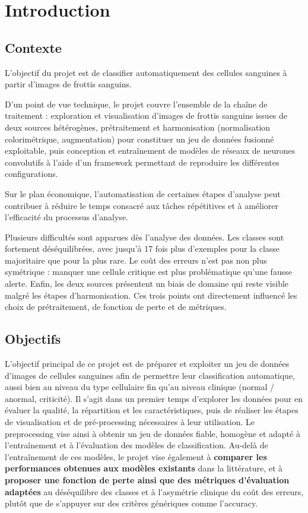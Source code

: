 \section{Introduction}
\subsection{Contexte}

L’objectif du projet est de classifier automatiquement des cellules sanguines à partir d’images de frottis sanguins.

D’un point de vue technique, le projet couvre l’ensemble de la chaîne de traitement : exploration et visualisation d’images de frottis sanguins issues de deux sources hétérogènes, prétraitement et harmonisation (normalisation colorimétrique, augmentation) pour constituer un jeu de données fusionné exploitable, puis conception et entraînement de modèles de réseaux de neurones convolutifs à l'aide d'un framework permettant de reproduire les différentes configurations.

Sur le plan économique, l’automatisation de certaines étapes d’analyse peut contribuer à réduire le temps consacré aux tâches répétitives et à améliorer l’efficacité du processus d’analyse.

Plusieurs difficultés sont apparues dès l’analyse des données. Les classes sont fortement déséquilibrées, avec jusqu’à 17 fois plus d’exemples pour la classe majoritaire que pour la plus rare. Le coût des erreurs n’est pas non plus symétrique : manquer une cellule critique est plus problématique qu’une fausse alerte. Enfin, les deux sources présentent un biais de domaine qui reste visible malgré les étapes d’harmonisation.
Ces trois points ont directement influencé les choix de prétraitement, de fonction de perte et de métriques.

\subsection{Objectifs}

L’objectif principal de ce projet est de préparer et exploiter un jeu de données d’images de cellules sanguines afin de permettre leur classification automatique, aussi bien au niveau du type cellulaire fin qu’au niveau clinique (normal / anormal, criticité).
Il s’agit dans un premier temps d’explorer les données pour en évaluer la qualité, la répartition et les caractéristiques, puis de réaliser les étapes de visualisation et de pré-processing nécessaires à leur utilisation.
Le preprocessing vise ainsi à obtenir un jeu de données fiable, homogène et adapté à l’entraînement et à l’évaluation des modèles de classification.
Au-delà de l’entraînement de ces modèles, le projet vise également à \textbf{comparer les performances obtenues aux modèles existants} dans la littérature, et à \textbf{proposer une fonction de perte ainsi que des métriques d’évaluation adaptées} au déséquilibre des classes et à l’asymétrie clinique du coût des erreurs, plutôt que de s’appuyer sur des critères génériques comme l’accuracy.

